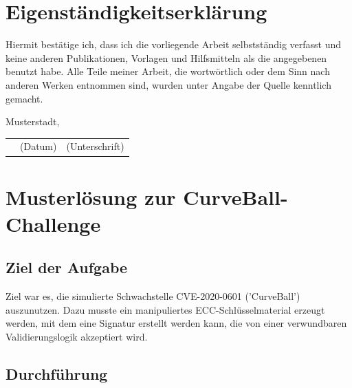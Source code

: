 \documentclass{article}
\begin{document}

\section*{Eigenständigkeitserklärung}
Hiermit bestätige ich, dass ich die vorliegende Arbeit selbstständig verfasst und keine anderen Publikationen, Vorlagen und Hilfsmitteln als die angegebenen benutzt habe. Alle Teile meiner Arbeit, die wortwörtlich oder dem Sinn nach anderen Werken entnommen sind, wurden unter Angabe der Quelle kenntlich gemacht.

\vspace{1cm}

Musterstadt, \underline{\hspace{0.815\textwidth}}\\
\begin{tabular}{lll}
\hspace{3cm} & \small(Datum)\hspace{1cm} & \hspace{2cm}\small(Unterschrift) \normalsize 
\end{tabular}

\newpage

\section*{Musterlösung zur CurveBall-Challenge}

\subsection*{Ziel der Aufgabe}

Ziel war es, die simulierte Schwachstelle CVE-2020-0601 ('CurveBall') auszunutzen. Dazu musste ein manipuliertes ECC-Schlüsselmaterial erzeugt werden, mit dem eine Signatur erstellt werden kann, die von einer verwundbaren Validierungslogik akzeptiert wird.

\subsection*{Durchführung}
\end{document}
